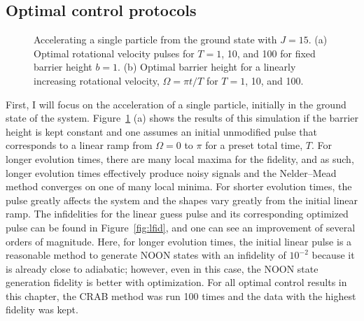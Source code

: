\subsection{Optimal control protocols}

\begin{figure}
 \centering
 \caption{Accelerating a single particle from the ground state with $J=15$.
 (a) Optimal rotational velocity pulses for $T = 1$, 10, and 100 for fixed barrier height $b=1$.
 (b) Optimal barrier height for a linearly increasing rotational velocity, $\Omega = \pi t/T$ for $T=1$, 10, and 100.}
 \label{fig:pulses}
\end{figure}

First, I will focus on the acceleration of a single particle, initially in the ground state of the system.
Figure~\ref{fig:pulses} (a) shows the results of this simulation if the barrier height is kept constant and one assumes an initial unmodified pulse that corresponds to a linear ramp from $\Omega = 0$ to $\pi$ for a preset total time, $T$.
For longer evolution times, there are many local maxima for the fidelity, and 
as such, longer evolution times effectively produce noisy signals and the Nelder--Mead method converges on one of many local minima.
For shorter evolution times, the pulse greatly affects the system and the shapes vary greatly from the initial linear ramp.
The infidelities for the linear guess pulse and its corresponding optimized pulse can be found in Figure~\ref{fig:lfid}, and one can see an improvement of several orders of magnitude.
Here, for longer evolution times, the initial linear pulse is a reasonable method to generate NOON states with an infidelity of $10^{-2}$ because it is already close to adiabatic; however, even in this case, the NOON state generation fidelity is better with optimization.
For all optimal control results in this chapter, the CRAB method was run 100 times and the data with the highest fidelity was kept.

